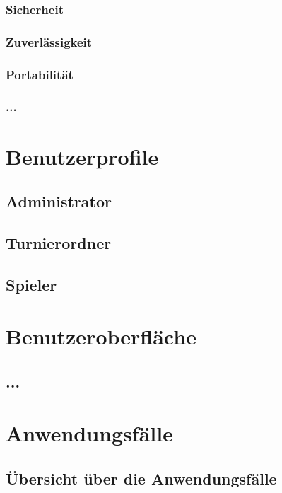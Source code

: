 \documentclass[11pt]{article}
\begin{document}
\subsubsection{Sicherheit}

\subsubsection{Zuverlässigkeit}

\subsubsection{Portabilität}

\subsubsection{...}

\section{Benutzerprofile}

\subsection{Administrator}

\subsection{Turnierordner}

\subsection{Spieler}

\section{Benutzeroberfläche}

\subsection{...}

\section{Anwendungsfälle}

\subsection{Übersicht über die Anwendungsfälle}
\end{document}
